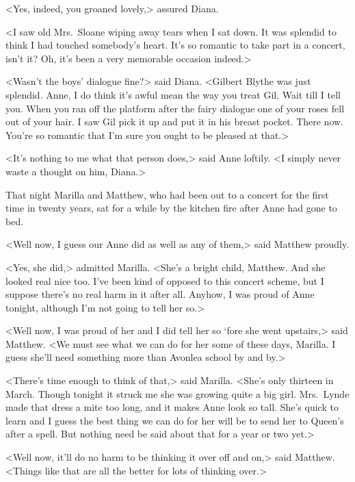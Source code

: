 <Yes, indeed, you groaned lovely,> assured Diana.

<I saw old Mrs.~Sloane wiping away tears when I sat down. It was splendid to think I had touched somebody's heart. It's so romantic to take part in a concert, isn't it? Oh, it's been a very memorable occasion indeed.>

<Wasn't the boys' dialogue fine?> said Diana. <Gilbert Blythe was just splendid. Anne, I do think it's awful mean the way you treat Gil. Wait till I tell you. When you ran off the platform after the fairy dialogue one of your roses fell out of your hair. I saw Gil pick it up and put it in his breast pocket. There now. You're so romantic that I'm sure you ought to be pleased at that.>

<It's nothing to me what that person does,> said Anne loftily. <I simply never waste a thought on him, Diana.>

That night Marilla and Matthew, who had been out to a concert for the first time in twenty years, sat for a while by the kitchen fire after Anne had gone to bed.

<Well now, I guess our Anne did as well as any of them,> said Matthew proudly.

<Yes, she did,> admitted Marilla. <She's a bright child, Matthew. And she looked real nice too. I've been kind of opposed to this concert scheme, but I suppose there's no real harm in it after all. Anyhow, I was proud of Anne tonight, although I'm not going to tell her so.>

<Well now, I was proud of her and I did tell her so ‘fore she went upstairs,> said Matthew. <We must see what we can do for her some of these days, Marilla. I guess she'll need something more than Avonlea school by and by.>

<There's time enough to think of that,> said Marilla. <She's only thirteen in March. Though tonight it struck me she was growing quite a big girl. Mrs.~Lynde made that dress a mite too long, and it makes Anne look so tall. She's quick to learn and I guess the best thing we can do for her will be to send her to Queen's after a spell. But nothing need be said about that for a year or two yet.>

<Well now, it'll do no harm to be thinking it over off and on,> said Matthew. <Things like that are all the better for lots of thinking over.>